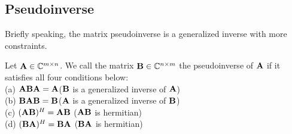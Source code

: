 

\subsection{Pseudoinverse}

Briefly speaking, the matrix pseudoinverse is a generalized inverse with more constraints.

\begin{definition}{}{}
    Let $\bold{A}\in\mathbb{C}^{m\times n}$. We call the matrix $\bold{B}\in \mathbb{C}^{n\times m}$ the pseudoinverse of $\bold{A}$ 
    if it satisfies all four conditions below:\\
    (a) $\bold{ABA}=\bold{A}$\quad ($\bold{B}$ is a generalized inverse of $\bold{A}$)\\
    (b) $\bold{BAB}=\bold{B}$\quad ($\bold{A}$ is a generalized inverse of $\bold{B}$)\\
    (c) $(\bold{AB})^H = \bold{AB}$ \quad ($\bold{AB}$ is hermitian)\\
    (d) $(\bold{BA})^H = \bold{BA}$ \quad ($\bold{BA}$ is hermitian)
\end{definition}

